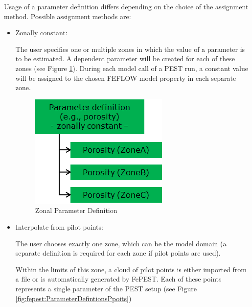 Usage of a parameter definition differs depending on the choice of the assignment method. Possible assignment methods are:

\begin{itemize}
\item Zonally constant:

The user specifies one or multiple zones in which the value of a parameter is to be estimated. A dependent parameter will be created for each of these zones (see Figure \ref{fig:fepest:ParameterDefintionsZones}). During each model call of a PEST run, a constant value will be assigned to the chosen FEFLOW model property in each separate zone. 

\begin{figure}
	\center
	\includegraphics[width=0.7\columnwidth]{figureFundamentalSetup/ParameterDefintionsZones.png}
\caption{Zonal Parameter Definition}
\label{fig:fepest:ParameterDefintionsZones}
\end{figure}

\item Interpolate from pilot points:

The user chooses exactly one zone, which can be the model domain (a separate definition is required for each zone if pilot points are used). 

Within the limits of this zone, a cloud of pilot points is either imported from a file or is automatically generated by FePEST. Each of these points represents a single parameter of the PEST setup (see Figure \ref{fig:fepest:ParameterDefintionsPpoits})


\end{itemize}
